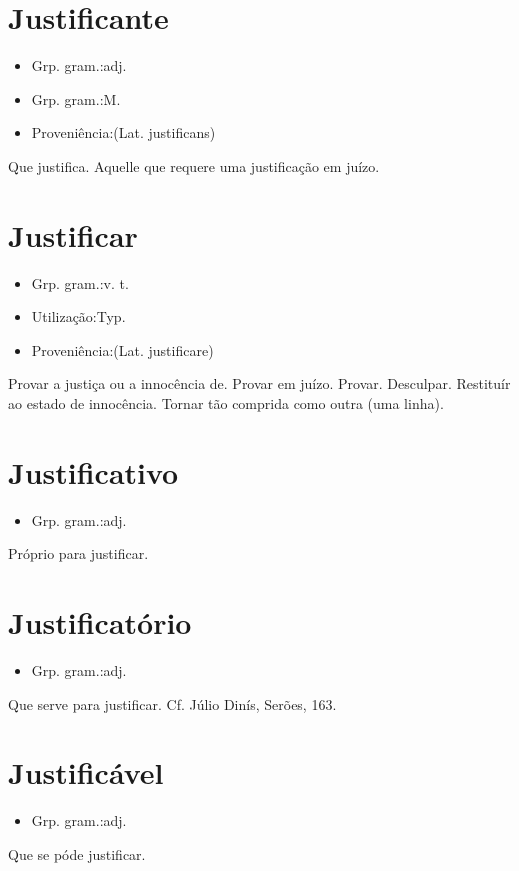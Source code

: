 \documentclass{article}
\begin{document}
\section{Justificante}
\begin{itemize}
\item {Grp. gram.:adj.}
\end{itemize}
\begin{itemize}
\item {Grp. gram.:M.}
\end{itemize}
\begin{itemize}
\item {Proveniência:(Lat. \textunderscore justificans\textunderscore )}
\end{itemize}
Que justifica.
Aquelle que requere uma justificação em juízo.
\section{Justificar}
\begin{itemize}
\item {Grp. gram.:v. t.}
\end{itemize}
\begin{itemize}
\item {Utilização:Typ.}
\end{itemize}
\begin{itemize}
\item {Proveniência:(Lat. \textunderscore justificare\textunderscore )}
\end{itemize}
Provar a justiça ou a innocência de.
Provar em juízo.
Provar.
Desculpar.
Restituír ao estado de innocência.
Tornar tão comprida como outra (uma linha).
\section{Justificativo}
\begin{itemize}
\item {Grp. gram.:adj.}
\end{itemize}
Próprio para justificar.
\section{Justificatório}
\begin{itemize}
\item {Grp. gram.:adj.}
\end{itemize}
Que serve para justificar. Cf. Júlio Dinís, \textunderscore Serões\textunderscore , 163.
\section{Justificável}
\begin{itemize}
\item {Grp. gram.:adj.}
\end{itemize}
Que se póde justificar.
\end{document}
